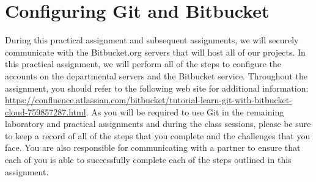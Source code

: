 \section*{Configuring Git and Bitbucket}

During this practical assignment and subsequent assignments, we will securely communicate with the Bitbucket.org servers
that will host all of our projects.  In this practical assignment, we will perform all of the steps to configure the
accounts on the departmental servers and the Bitbucket service.  Throughout the assignment, you should refer to the
following web site for additional information: \url{https://confluence.atlassian.com/bitbucket/tutorial-learn-git-with-bitbucket-cloud-759857287.html}.
As you will be required to use Git in the remaining laboratory and practical assignments and during the class sessions,
please be sure to keep a record of all of the steps that you complete and the challenges that you face.  You are also
responsible for communicating with a partner to ensure that each of you is able to successfully complete each of the
steps outlined in this assignment.

